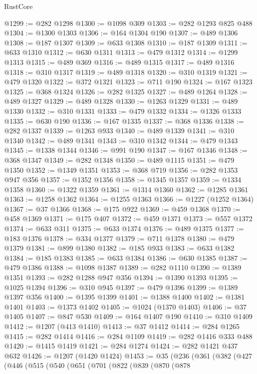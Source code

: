\begin{lexlean}{RustCore}
\begin{coremodule}
@1299 := @282 @1298
@1300 := @1098 @309
@1303 := @282 @1293 @825 @488
@1304 := @1300 @1303
@1306 := @164 @1304 @190
@1307 := @489 @1306
@1308 := @187 @1307
@1309 := @633 @1308
@1310 := @187 @1309
@1311 := @633 @1310
@1312 := @630 @1311
@1313 := @479 @1312
@1314 := @1299 @1313
@1315 := @489 @369
@1316 := @489 @1315
@1317 := @489 @1316
@1318 := @310 @1317
@1319 := @489 @1318
@1320 := @310 @1319
@1321 := @479 @1320
@1322 := @372 @1321
@1323 := @711 @190
@1324 := @167 @1323
@1325 := @368 @1324
@1326 := @282 @1325
@1327 := @489 @1264
@1328 := @489 @1327
@1329 := @489 @1328
@1330 := @1263 @1329
@1331 := @489 @1330
@1332 := @310 @1331
@1333 := @479 @1332
@1334 := @1326 @1333
@1335 := @630 @190
@1336 := @167 @1335
@1337 := @368 @1336
@1338 := @282 @1337
@1339 := @1263 @933
@1340 := @489 @1339
@1341 := @310 @1340
@1342 := @489 @1341
@1343 := @310 @1342
@1344 := @479 @1343
@1345 := @1338 @1344
@1346 := @991 @190
@1347 := @167 @1346
@1348 := @368 @1347
@1349 := @282 @1348
@1350 := @489 @1115
@1351 := @479 @1350
@1352 := @1349 @1351
@1353 := @368 @719
@1356 := @282 @1353 @947 @356
@1357 := @1352 @1356
@1358 := @1345 @1357
@1359 := @1334 @1358
@1360 := @1322 @1359
@1361 := @1314 @1360
@1362 := @1285 @1361
@1363 := @1258 @1362
@1364 := @1255 @1363
@1366 := @1227 (@1252 @1364)
@1367 := @37 @1366
@1368 := @175 @922
@1369 := @459 @1368
@1370 := @458 @1369
@1371 := @175 @407
@1372 := @459 @1371
@1373 := @557 @1372
@1374 := @633 @311
@1375 := @633 @1374
@1376 := @489 @1375
@1377 := @183 @1376
@1378 := @334 @1377
@1379 := @711 @1378
@1380 := @479 @1379
@1381 := @899 @1380
@1382 := @185 @933
@1383 := @633 @1382
@1384 := @185 @1383
@1385 := @633 @1384
@1386 := @630 @1385
@1387 := @479 @1386
@1388 := @1098 @1387
@1389 := @282 @1110
@1390 := @1389 @1351
@1393 := @282 @1288 @947 @356
@1394 := @1390 @1393
@1395 := @1025 @1394
@1396 := @310 @945
@1397 := @479 @1396
@1399 := @1389 @1397 @356
@1400 := @1395 @1399
@1401 := @1388 @1400
@1402 := @1381 @1401
@1403 := @1373 @1402
@1405 := @1024 (@1370 @1403)
@1406 := @37 @1405
@1407 := @847 @530
@1409 := @164 @1407 @190
@1410 := @310 @1409
@1412 := @1207 (@413 @1410)
@1413 := @37 @1412
@1414 := @284 @1265
@1415 := @282 @1414
@1416 := @284 @1109
@1419 := @282 @1416 @333 @488
@1420 := @1415 @1419
@1421 := @284 @1274
@1424 := @282 @1421 @437 @632
@1426 := @1207 (@1420 @1424)
@1453 := @35
    (@236
      (@361
        (@382
          (@427
            (@446
              (@515
                (@540
                  (@651
                    (@701
                      (@822
                        (@839
                          (@870
                            (@878

\end{coremodule}
\end{lexlean}
